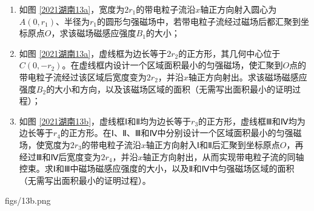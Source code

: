 \documentclass[\gkver]{gaokaozhenti}
\begin{document}
\begin{enumerate}
\begin{enumerate}
	\item
	如图 \ref{2021湖南13a}，宽度为$2r_{1}$的带电粒子流沿$x$轴正方向射入圆心为$A(0,r_{1})$、半径为$r_{1}$的圆形匀强磁场中，若带电粒子流经过磁场后都汇聚到坐标原点$O$，求该磁场磁感应强度$B_{1}$的大小；

	\item
	如图 \ref{2021湖南13a}，虚线框为边长等于$2r_{2}$的正方形，其几何中心位于$C(0,-r_{2})$。在虚线框内设计一个区域面积最小的匀强磁场，使汇聚到$O$点的带电粒子流经过该区域后宽度变为$2r_{2}$，并沿$x$轴正方向射出。求该磁场磁感应强度$B_{2}$的大小和方向，以及该磁场区域的面积（无需写出面积最小的证明过程）；

	\item
	如图 \ref{2021湖南13b}，虚线框Ⅰ和Ⅱ均为边长等于$r_{3}$的正方形，虚线框Ⅲ和Ⅳ均为边长等于$r_{4}$的正方形。在Ⅰ、Ⅱ、Ⅲ和Ⅳ中分别设计一个区域面积最小的匀强磁场，使宽度为$2r_{3}$的带电粒子流沿$x$轴正方向射入Ⅰ和Ⅱ后汇聚到坐标原点$O$，再经过Ⅲ和Ⅳ后宽度变为$2r_{4}$，并沿$x$轴正方向射出，从而实现带电粒子流的同轴控束。求Ⅰ和Ⅲ中磁场磁感应强度的大小，以及Ⅱ和Ⅳ中匀强磁场区域的面积（无需写出面积最小的证明过程）。
\end{enumerate}

{figs/13b.png}

\end{enumerate}
\end{document}
